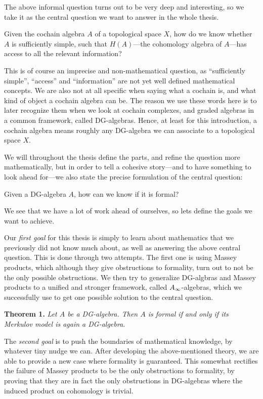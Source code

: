 The above informal question turns out to be very deep and interesting, so we take it as the central question we want to answer in the whole thesis. 

\begin{central}
Given the cochain algebra $A$ of a topological space $X$, how do we know whether $A$ is sufficiently simple, such that $H(A)$---the cohomology algebra of $A$---has access to all the relevant information?
\end{central}

This is of course an imprecise and non-mathematical question, as ``sufficiently simple'', ``access'' and ``information'' are not yet well defined mathematical concepts. We are also not at all specific when saying what a cochain is, and what kind of object a cochain algebra can be. The reason we use these words here is to later recognize them when we look at cochain complexes, and graded algebras in a common framework, called DG-algebras. Hence, at least for this introduction, a cochain algebra means roughly any DG-algebra we can associate to a topological space $X$. 

We will throughout the thesis define the parts, and refine the question more mathematically, but in order to tell a cohesive story---and to have something to look ahead for---we also state the precise formulation of the central question:

\begin{central}
Given a DG-algebra $A$, how can we know if it is formal?
\end{central}

We see that we have a lot of work ahead of ourselves, so lets define the goals we want to achieve. 

Our \textit{first goal} for this thesis is simply to learn about mathematics that we previously did not know much about, as well as answering the above central question. This is done through two attempts. The first one is using Massey products, which although they give obstructions to formality, turn out to not be the only possible obstructions. We then try to generalize DG-algbras and Massey products to a unified and stronger framework, called $A_{\infty}$-algebras, which we successfully use to get one possible solution to the central question. 

\textbf{Theorem 1.} \textit{Let $A$ be a DG-algebra. Then $A$ is formal if and only if its Merkulov model is again a DG-algebra.}

The \textit{second goal} is to push the boundaries of mathematical knowledge, by whatever tiny nudge we can. After developing the above-mentioned theory, we are able to provide a new case where formality is guaranteed. This somewhat rectifies the failure of Massey products to be the only obstructions to formality, by proving that they are in fact the only obstructions in DG-algebras where the induced product on cohomology is trivial. 

